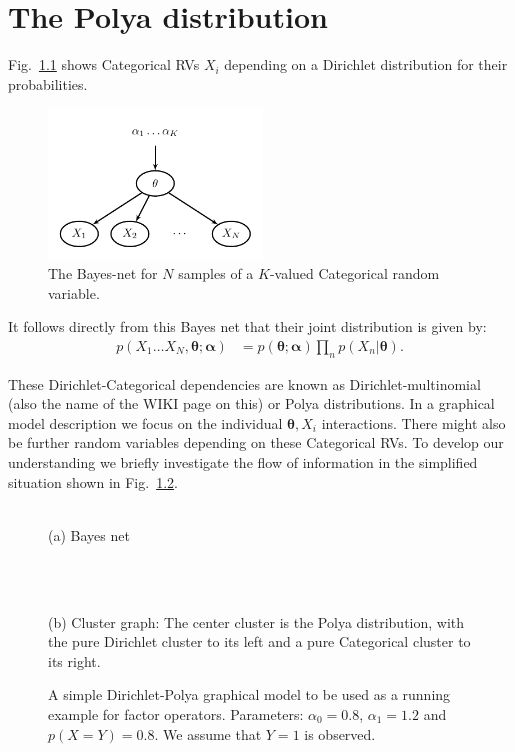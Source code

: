 \documentclass[oneside,english]{scrbook}
\begin{document}
\chapter{The Polya distribution} \label{ch:polya}
Fig.~\ref{fig:polya_bn} shows Categorical RVs $X_i$ depending on a
Dirichlet distribution for their probabilities.
\begin{figure}[h]
\noindent \begin{centering}
\includegraphics[height=4cm]{polya_bn.pdf}
\par\end{centering}
\caption{The Bayes-net for $N$ samples of a $K$-valued Categorical random variable.}
\label{fig:polya_bn}
\end{figure}

It follows directly from this Bayes net that their joint distribution
is given by:
\begin{align*}
  p(X_1\ldots X_N,\bm{\theta};\bm{\alpha})
  &= p(\bm{\theta};\bm{\alpha}) \prod_{n} p(X_n|\bm{\theta}).
\end{align*}

These Dirichlet-Categorical dependencies are known as
Dirichlet-multinomial (also the name of the WIKI page on this) or
Polya distributions. In a graphical model description we focus on the
individual $\bm{\theta},X_i$ interactions. There might also be further
random variables depending on these Categorical RVs. To develop our
understanding we briefly investigate the flow of information in the
simplified situation shown in Fig.~\ref{fig:polyabasic}.

\begin{figure}[!h]
  \begin{centering}
    \parbox{0.9\textwidth}{
      \centering
      \\
      (a) Bayes net
    }\\[5mm]
  \end{centering}
  \begin{centering}
    \parbox{0.9\textwidth}{ \centering
      \\ (b)
      Cluster graph: The center cluster is the Polya distribution,
      with the pure Dirichlet cluster to its left and a pure
      Categorical cluster to its right.}
  \end{centering}
  \caption{A simple Dirichlet-Polya graphical model to be used as a
    running example for factor operators. Parameters: $\alpha_0 =
    0.8$, $\alpha_1 = 1.2$ and $p(X=Y)=0.8$. We assume that $Y=1$ is
    observed.}  \label{fig:polyabasic}
\end{figure}
\end{document}

